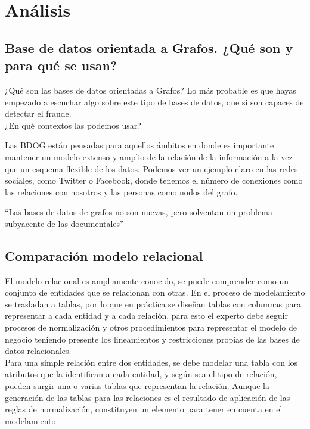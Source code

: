 \documentclass[preprint,12pt]{elsarticle}
\begin{document}
 



\section{Análisis}

\subsection{\textbf{Base de datos orientada a Grafos. ¿Qué son y para qué se usan?}}
¿Qué son las bases de datos orientadas a Grafos? Lo más probable es que hayas empezado a escuchar algo sobre este tipo de bases de datos, que si son capaces de detectar el fraude.\\

¿En qué contextos las podemos usar?

Las BDOG están pensadas para aquellos ámbitos en donde es importante mantener un modelo extenso y amplio de la relación de la información a la vez que un esquema flexible de los datos. Podemos ver un ejemplo claro en las redes sociales, como Twitter o Facebook, donde tenemos el número de conexiones como las relaciones con nosotros y las personas como nodos del grafo.

“Las bases de datos de grafos no son nuevas, pero solventan un problema subyacente de las documentales”



\subsection{\textbf{Comparación modelo relacional}}
El modelo relacional es ampliamente conocido, se puede comprender como un conjunto de entidades que se relacionan con otras. En el proceso de modelamiento se trasladan a tablas, por lo que en práctica se diseñan tablas con columnas para representar a cada entidad y a cada relación, para esto el experto debe seguir procesos de normalización y otros procedimientos para representar el modelo de negocio teniendo presente los lineamientos y restricciones propias de las bases de datos relacionales.\\

Para una simple relación entre dos entidades, se debe modelar una tabla con los atributos que la identifican a cada entidad, y según sea el tipo de relación, pueden surgir una o varias tablas que representan la relación. Aunque la generación de las tablas para las relaciones es el resultado de aplicación de las reglas de normalización, constituyen un elemento para tener en cuenta en el modelamiento.\\
\end{document}
